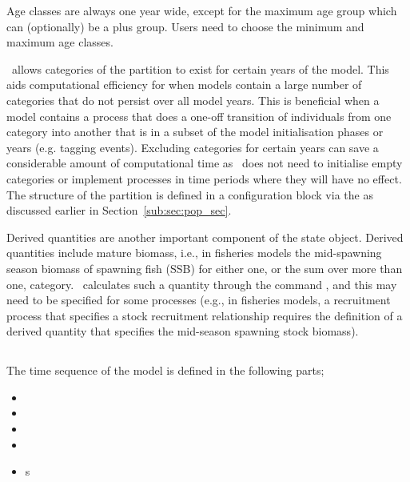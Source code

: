 Age classes are always one year wide, except for the maximum age group which can (optionally) be a plus group. Users need to choose the minimum and maximum age classes. 

\CNAME\ allows categories of the partition to exist for certain years of the model. This aids computational efficiency for when models contain a large number of categories that do not persist over all model years. This is beneficial when a model contains a process that does a one-off transition of individuals from one category into another that is in a subset of the model initialisation phases or years (e.g. tagging events). Excluding categories for certain years can save a considerable amount of computational time as \CNAME\ does not need to initialise empty categories or implement processes in time periods where they will have no effect. The structure of the partition is defined in a configuration block via the  as discussed earlier in Section~\ref{sub:sec:pop_sec}.

Derived quantities are another important component of the state object. Derived quantities include mature biomass, i.e., in fisheries models the mid-spawning season biomass of spawning fish (SSB) for either one, or the sum over more than one, category. \CNAME\ calculates such a quantity through the command , and this may need to be specified for some processes (e.g., in fisheries models, a recruitment process that specifies a stock recruitment relationship requires the definition of a derived quantity that specifies the mid-season spawning stock biomass).

\subsection{}

The time sequence of the model is defined in the following parts;
\begin{itemize}
  \item {}
  \item {}
  \item {}
  \item {}
  \item {}s
\end{itemize}

\subsubsection{}

